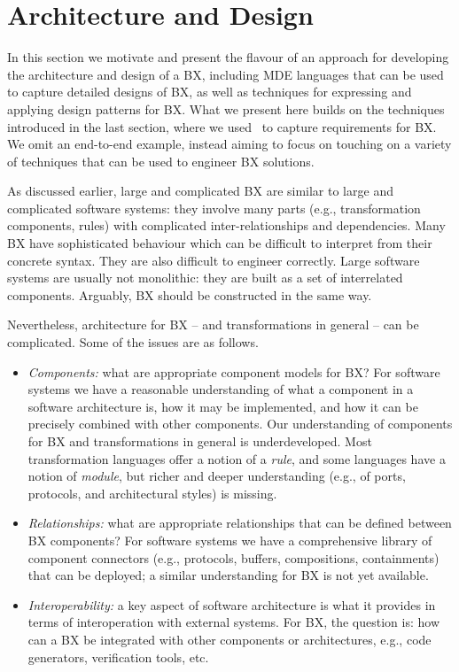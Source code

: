 \section{Architecture and Design}
\label{section:architecture-and-design}

In this section we motivate and present the flavour of an approach for developing the architecture and design of a BX, including MDE languages that can be used to capture detailed designs of BX, as well as techniques for expressing and applying design patterns for BX. What we present here builds on the techniques introduced in the last section, where we used \transml\ to capture requirements for BX. We omit an end-to-end example, instead aiming to focus on touching on a variety of techniques that can be used to engineer BX solutions.

As discussed earlier, large and complicated BX are similar to large and complicated software systems: they involve many parts (e.g., transformation components, rules) with complicated inter-relationships and dependencies. Many BX have sophisticated behaviour which can be difficult to interpret from their concrete syntax. They are also difficult to engineer correctly. Large software systems are usually not monolithic: they are built as a set of interrelated components. Arguably, BX should be constructed in the same way. 

Nevertheless, architecture for BX -- and transformations in general -- can be complicated. Some of the issues are as follows.
\begin{itemize}
\item \textit{Components:} what are appropriate component models for BX? For software systems we have a reasonable understanding of what a component in a software architecture is, how it may be implemented, and how it can be precisely combined with other components. Our understanding of components for BX and transformations in general is underdeveloped. Most transformation languages offer a notion of a \textit{rule}, and some languages have a notion of \textit{module}, but richer and deeper understanding (e.g., of ports, protocols, and architectural styles) is missing.

\item \textit{Relationships:} what are appropriate relationships that can be defined between BX components? For software systems we have a comprehensive library of component connectors (e.g., protocols, buffers, compositions, containments) that can be deployed; a similar understanding for BX is not yet available.

\item \textit{Interoperability:} a key aspect of software architecture is what it provides in terms of interoperation with external systems. For BX, the question is: how can a BX be integrated with other components or architectures, e.g., code generators, verification tools, etc. 
\end{itemize}

